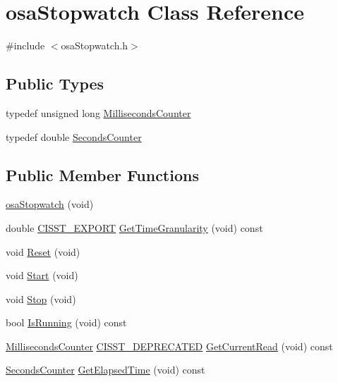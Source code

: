 \hypertarget{classosa_stopwatch}{}\section{osa\+Stopwatch Class Reference}
\label{classosa_stopwatch}


{\ttfamily \#include $<$osa\+Stopwatch.\+h$>$}

\subsection*{Public Types}
\begin{DoxyCompactItemize}
\item 
typedef unsigned long \hyperlink{classosa_stopwatch_a1965d1eca46d883235a26d1ee2920c2f}{Milliseconds\+Counter}
\item 
typedef double \hyperlink{classosa_stopwatch_af99ed194ad28f06f68aa66c81ae93517}{Seconds\+Counter}
\end{DoxyCompactItemize}
\subsection*{Public Member Functions}
\begin{DoxyCompactItemize}
\item 
\hyperlink{classosa_stopwatch_ac84e6730acab9c10fdd183fbc570dd48}{osa\+Stopwatch} (void)
\item 
double \hyperlink{cmn_export_macros_8h_a99393e0c3ac434b2605235bbe20684f8}{C\+I\+S\+S\+T\+\_\+\+E\+X\+P\+O\+R\+T} \hyperlink{classosa_stopwatch_aaeee3a1a11b82430e3deeab9e040ff7d}{Get\+Time\+Granularity} (void) const 
\item 
void \hyperlink{classosa_stopwatch_ab01ee43dc8f0aa7dc395952391abfa2c}{Reset} (void)
\item 
void \hyperlink{classosa_stopwatch_aabe27a9580a1c91dd5f9af3fa8e43c76}{Start} (void)
\item 
void \hyperlink{classosa_stopwatch_abe78ec771bed0e97d42d51251f16046c}{Stop} (void)
\item 
bool \hyperlink{classosa_stopwatch_a30e67dba34aef8524473bd82a253aba1}{Is\+Running} (void) const 
\item 
\hyperlink{classosa_stopwatch_a1965d1eca46d883235a26d1ee2920c2f}{Milliseconds\+Counter} \hyperlink{cmn_portability_8h_a63da7164735f9501be651b1f2bbc0121}{C\+I\+S\+S\+T\+\_\+\+D\+E\+P\+R\+E\+C\+A\+T\+E\+D} \hyperlink{classosa_stopwatch_a874511bfee93600d9c47d43b3e5c3f9d}{Get\+Current\+Read} (void) const 
\item 
\hyperlink{classosa_stopwatch_af99ed194ad28f06f68aa66c81ae93517}{Seconds\+Counter} \hyperlink{classosa_stopwatch_a437cf8dbddb7a176baa506ca4a882935}{Get\+Elapsed\+Time} (void) const 
\end{DoxyCompactItemize}


